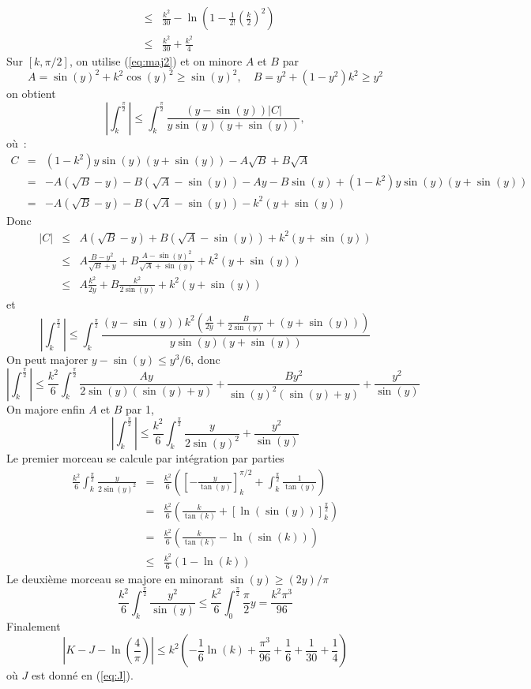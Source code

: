 \documentclass[a4paper,11pt]{article}
\begin{document}
\begin{giacjshere}
\begin{eqnarray*}
&\leq & \frac{k^2}{30}-  \ln (1- \frac{1}{2!}\left(\frac{k}{2}\right)^2) \\
&\leq &  \frac{k^2}{30} +\frac{k^2}{4}
\end{eqnarray*}
Sur $[k,\pi/2]$, on utilise (\ref{eq:maj2})
et on minore $A$ et $B$ par
\[ A=\sin(y)^2+k^2 \cos(y)^2 \geq \sin(y)^2, \quad B=y^2+(1-y^2)k^2 \geq y^2\]
on obtient
\[ 
| \int_k^{\frac{\pi}{2}} | \leq  \int_k^{\frac{\pi}{2}}
\frac{(y-\sin(y))|C|}
{y \sin(y) (y+\sin(y))} , 
\]
où~:
\begin{eqnarray*}
C&=&(1-k^2)y \sin(y)(y+\sin(y))-A\sqrt{B}+B\sqrt{A} \\
&=& -A(\sqrt{B}-y)-B(\sqrt{A}-\sin(y))
-Ay-B\sin(y) + (1-k^2)y \sin(y)(y+\sin(y)) \\
&=& -A(\sqrt{B}-y)-B(\sqrt{A}-\sin(y)) - k^2(y+\sin(y))
\end{eqnarray*}
Donc
\begin{eqnarray*}
 |C| &\leq& A(\sqrt{B}-y)+B(\sqrt{A}-\sin(y)) + k^2(y+\sin(y)) \\
&\leq& A \frac{B-y^2}{\sqrt{B}+y}
+ B \frac{A-\sin(y)^2}{\sqrt{A}+\sin(y)} + k^2(y+\sin(y)) \\
&\leq & A \frac{k^2}{2y} + B \frac{k^2}{2\sin(y)} + k^2(y+\sin(y))
\end{eqnarray*}
et
\[ 
| \int_k^{\frac{\pi}{2}} | \leq 
\int_k^{\frac{\pi}{2} }
\frac{(y-\sin(y))k^2(\frac{A}{2y} + \frac{B}{2\sin(y)} + (y+\sin(y))) }
{y \sin(y) (y+\sin(y))}
\]
On peut majorer $y-\sin(y) \leq y^3/6$, donc
\[ 
| \int_k^{\frac{\pi}{2}} | \leq 
\frac{k^2}{6} \int_k^{\frac{\pi}{2}}
 \frac{Ay}{2\sin(y) (\sin(y)+y)} + \frac{By^2}{\sin(y)^2(\sin(y)+y)} + \frac{y^2}{\sin(y)}
\]
On majore enfin $A$ et $B$ par 1, 
\[ | \int_k^{\frac{\pi}{2}} |
\leq \frac{k^2}{6} \int_k^{\frac{\pi}{2}}
\frac{y}{2\sin(y)^2} + \frac{y^2}{\sin(y)}
\]
Le premier morceau se calcule par intégration par parties
\begin{eqnarray*}
\frac{k^2}{6} \int_k^{\frac{\pi}{2}}
\frac{y}{2\sin(y)^2}
&=&
\frac{k^2}{6} \left( [-\frac{y}{\tan(y)}]_k^{\pi/2} 
+ \int_k^{\frac{\pi}{2}} \frac{1}{\tan(y)}
\right) \\
&=& \frac{k^2}{6} \left(\frac{k}{\tan(k)}+ [\ln(\sin(y))]_k^{\frac{\pi}{2}} \right)\\
&=& \frac{k^2}{6} \left(\frac{k}{\tan(k)}-\ln(\sin(k)) \right)\\
&\leq &  \frac{k^2}{6}(1-\ln(k))
\end{eqnarray*}
Le deuxième morceau se majore en minorant $\sin(y)\geq (2y)/\pi$
\[ 
\frac{k^2}{6} \int_k^{\frac{\pi}{2}} \frac{y^2}{\sin(y)}
\leq \frac{k^2}{6} \int_0^{\frac{\pi}{2}} \frac{\pi}{2} y
= \frac{k^2\pi^3}{96} 
\]
Finalement
\[ |K-J-\ln(\frac{4}{\pi})| 
\leq k^2 \left( -\frac{1}{6} \ln(k) + \frac{\pi^3}{96} + \frac{1}{6} + \frac{1}{30}+ 
\frac{1}{4} \right)
\]
où $J$ est donné en (\ref{eq:J}).


\end{giacjshere}
\end{document}
